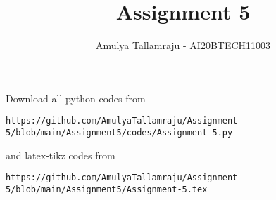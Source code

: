 \documentclass[journal,12pt,twocolumn]{IEEEtran}
\begin{document}
\title{Assignment 5}%
\author{Amulya Tallamraju - AI20BTECH11003}
\maketitle
\newpage
\bigskip
\renewcommand{\thefigure}{\theenumi}
\renewcommand{\thetable}{\theenumi}
\newcommand*{\permcomb}[4][0mu]{{{}^{#3}\mkern#1#2_{#4}}}
\newcommand*{\perm}[1][-3mu]{\permcomb[#1]{P}}
\newcommand*{\comb}[1][-1mu]{\permcomb[#1]{C}}
Download all python codes from 
\begin{lstlisting}
https://github.com/AmulyaTallamraju/Assignment-5/blob/main/Assignment5/codes/Assignment-5.py
\end{lstlisting}
%
and latex-tikz codes from 
%
\begin{lstlisting}
https://github.com/AmulyaTallamraju/Assignment-5/blob/main/Assignment5/Assignment-5.tex
\end{lstlisting}
\renewcommand{\theequation}{\theenumi}
\renewcommand{\thefigure}{\theenumi}

\end{document}
